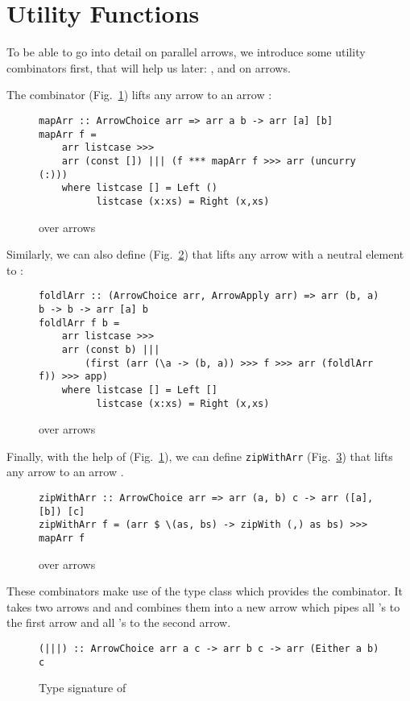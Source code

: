 \section{Utility Functions}\label{utilfns}
To be able to go into detail on parallel arrows, we introduce some utility combinators first, that will help us later: ,  and  on arrows.

The  combinator (Fig.~\ref{fig:mapArr}) lifts any arrow  to an arrow  \cite{programming_with_arrows}:
\begin{figure}[h]
\begin{lstlisting}[frame=htrbl]
mapArr :: ArrowChoice arr => arr a b -> arr [a] [b]
mapArr f =
	arr listcase >>>
	arr (const []) ||| (f *** mapArr f >>> arr (uncurry (:)))
	where listcase [] = Left ()
	      listcase (x:xs) = Right (x,xs)
\end{lstlisting}
\caption{ over arrows}
\label{fig:mapArr}
\end{figure}
Similarly, we can also define  (Fig.~\ref{fig:foldlArr}) that lifts any arrow  with a neutral element  to :
\begin{figure}[h]
\begin{lstlisting}[frame=htrbl]
foldlArr :: (ArrowChoice arr, ArrowApply arr) => arr (b, a) b -> b -> arr [a] b
foldlArr f b =
	arr listcase >>>
	arr (const b) |||
		(first (arr (\a -> (b, a)) >>> f >>> arr (foldlArr f)) >>> app)
	where listcase [] = Left []
	      listcase (x:xs) = Right (x,xs)
\end{lstlisting}
\caption{ over arrows}
\label{fig:foldlArr}
\end{figure}
Finally, with the help of  (Fig.~\ref{fig:mapArr}), we can define \lstinline{zipWithArr} (Fig.~\ref{fig:zipWithArr}) that lifts any arrow  to an arrow .
\begin{figure}[h]
\begin{lstlisting}[frame=htrbl]
zipWithArr :: ArrowChoice arr => arr (a, b) c -> arr ([a], [b]) [c]
zipWithArr f = (arr $ \(as, bs) -> zipWith (,) as bs) >>> mapArr f
\end{lstlisting}
\caption{ over arrows}
\label{fig:zipWithArr}
\end{figure}
These combinators make use of the  type class which provides the \inlinecode{(|||)} combinator. It takes two arrows  and  and combines them into a new arrow  which pipes all 's to the first arrow and all 's to the second arrow.
\begin{figure}[h]
\begin{lstlisting}[frame=htrbl]
(|||) :: ArrowChoice arr a c -> arr b c -> arr (Either a b) c
\end{lstlisting}
\caption{Type signature of \inlinecode{(|||)}}
\label{fig:codeSig|||}
\end{figure}

